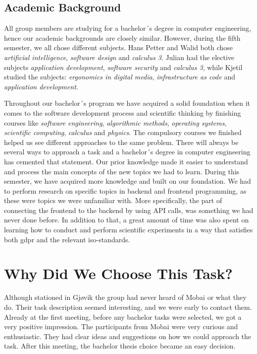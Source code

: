 \subsection{Academic Background}
\label{section:academic background}
All group members are studying for a bachelor´s degree in computer engineering, hence our academic backgrounds are closely similar. However, during the fifth semester, we all chose different subjects. Hans Petter and Walid both chose \textit{artificial intelligence}, \textit{software design} and \textit{calculus 3}. Julian had the elective subjects \textit{application development}, \textit{software security} and \textit{calculus 3}, while Kjetil studied the subjects: \textit{ergonomics in digital media}, \textit{infrastructure as code} and \textit{application development}. 

Throughout our bachelor´s program we have acquired a solid foundation when it comes to the software development process and scientific thinking by finishing courses like \textit{software engineering}, \textit{algorithmic methods}, \textit{operating systems}, \textit{scientific computing}, \textit{calculus} and \textit{physics}. The compulsory courses we finished helped us see different approaches to the same problem. There will always be several ways to approach a task and a bachelor´s degree in computer engineering has cemented that statement. Our prior knowledge made it easier to understand and process the main concepts of the new topics we had to learn. 
During this semester, we have acquired more knowledge and built on our foundation. We had to perform research on specific topics in backend and frontend programming, as these were topics we were unfamiliar with. More specifically, the part of connecting the frontend to the backend by using API calls, was something we had never done before. In addition to that, a great amount of time was also spent on learning how to conduct and perform scientific experiments in a way that satisfies both \acrfull{gdpr} and the relevant \acrshort{iso}-standards.  

\section{Why Did We Choose This Task?}
Although stationed in Gjøvik the group had never heard of Mobai or what they do. Their task description seemed interesting, and we were early to contact them. Already at the first meeting, before any bachelor tasks were selected, we got a very positive impression. The participants from Mobai were very curious and enthusiastic. They had clear ideas and suggestions on how we could approach the task. After this meeting, the bachelor thesis choice became an easy decision. 


